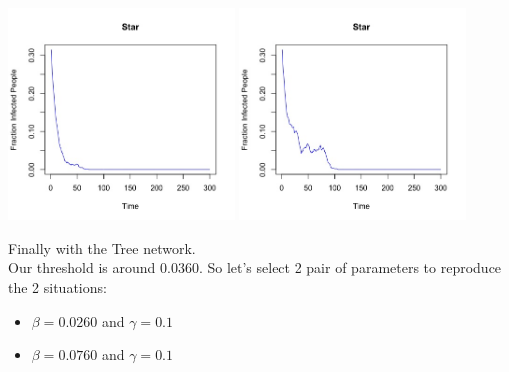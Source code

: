 \documentclass{article}
\begin{document}
\begin{center}
   
    
    \includegraphics[width=6cm]{star_small.jpeg}
    \includegraphics[width=6cm]{star_big.jpeg}
    
    
\end{center}



\newpage




\noindent Finally with the Tree network.\\

\noindent Our threshold is around $0.0360$. So let's select 2 pair of parameters to reproduce the 2 situations:\\

\begin{itemize}
  \item $\beta = 0.0260$ and $\gamma = 0.1$
  \item $\beta = 0.0760$ and $\gamma = 0.1$\\
\end{itemize}
\end{document}
